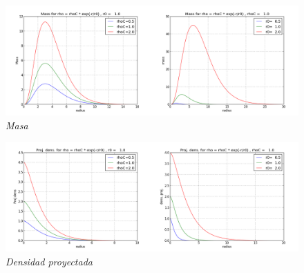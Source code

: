 \documentclass[12pt]{book}
\begin{document}
\begin{description}
\item

\begin{figure}[!ht]
 \centering
 \includegraphics[scale=0.33]{massFinal.png}
 \caption{\emph{Masa}}
\end{figure}

\item

\begin{figure}[!ht]
 \centering
 \includegraphics[scale=0.33]{dpFinal.png}
 \caption{\emph{Densidad proyectada}}
\end{figure}
\end{description}


\clearpage
\end{document}
